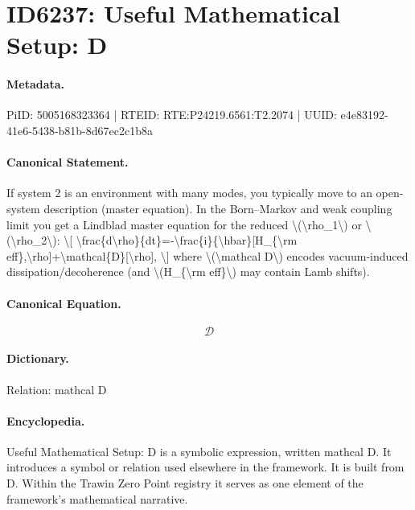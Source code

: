 \section*{ID6237: Useful Mathematical Setup: D}
\paragraph{Metadata.}
PiID: 5005168323364 | RTEID: RTE:P24219.6561:T2.2074 | UUID: e4e83192-41e6-5438-b81b-8d67ec2c1b8a

\paragraph{Canonical Statement.}
If system 2 is an environment with many modes, you typically move to an open-system description (master equation). In the Born–Markov and weak coupling limit you get a Lindblad master equation for the reduced \textbackslash{}(\textbackslash{}rho\_1\textbackslash{}) or \textbackslash{}(\textbackslash{}rho\_2\textbackslash{}): \textbackslash{}[ \textbackslash{}frac\{d\textbackslash{}rho\}\{dt\}=-\textbackslash{}frac\{i\}\{\textbackslash{}hbar\}[H\_\{\textbackslash{}rm eff\},\textbackslash{}rho]+\textbackslash{}mathcal\{D\}[\textbackslash{}rho], \textbackslash{}] where \textbackslash{}(\textbackslash{}mathcal D\textbackslash{}) encodes vacuum-induced dissipation/decoherence (and \textbackslash{}(H\_\{\textbackslash{}rm eff\}\textbackslash{}) may contain Lamb shifts).

\paragraph{Canonical Equation.}
\[
\mathcal D
\]

\paragraph{Dictionary.}
Relation: mathcal D

\paragraph{Encyclopedia.}
Useful Mathematical Setup: D is a symbolic expression, written mathcal D. It introduces a symbol or relation used elsewhere in the framework. It is built from D. Within the Trawin Zero Point registry it serves as one element of the framework's mathematical narrative.
